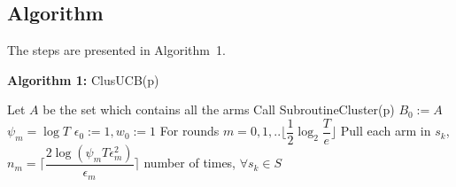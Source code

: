\subsection*{Algorithm}

The steps are presented in Algorithm~1.\\%
\begin{algorithm}
\textbf{Algorithm 1:} ClusUCB(p)\\[-0.3cm]
\begin{algorithmic}[1]
\State Let $A$ be the set which contains all the arms
\State Call SubroutineCluster(p)
\State $B_{0}:=A$
\State $\psi_{m}=\log T$
\State $ \epsilon_{0}:=1, w_{0}:=1$
\State For rounds $m=0,1,..\big \lfloor \dfrac{1}{2}\log_{2} \dfrac{T}{e}\big\rfloor$
\State \hspace*{2em} Pull each arm in $s_{k}$, \newline\hspace*{2em}$n_{m}=\bigg\lceil\dfrac{2\log{(\psi_{m}T\epsilon_{m}^{2})}}{\epsilon_{m}}\bigg\rceil$ number of times, $\forall s_{k}\in S$ 

\end{algorithmic}
\end{algorithm}
